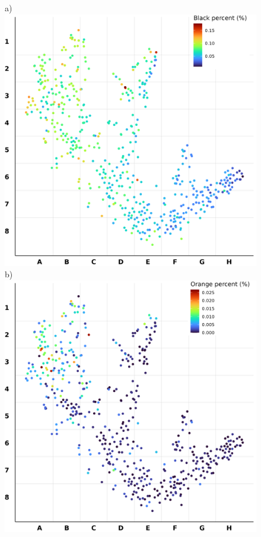 \documentclass[preprint,10pt]{elsarticle} %
\begin{document}
\begin{figure}
\centering
\scriptsize{a)} \includegraphics[trim={ 0 0 0 0 },clip,scale=0.35]{Images/City_Types_Dimension_chessboard_blkPct.png}
\scriptsize{b)} \includegraphics[trim={ 0 0 0 0 },clip,scale=0.35]{Images/City_Types_Dimension_chessboard_orangepct.png}

\end{figure}
\end{document}
